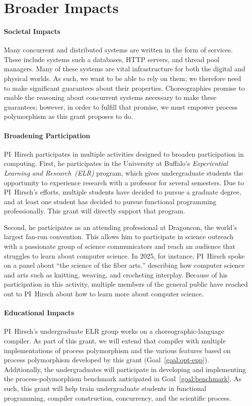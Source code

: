 \section{Broader Impacts}
\label{sec:broader}

\paragraph{Societal Impacts}
Many concurrent and distributed systems are written in the form of services.
These include systems such a databases, HTTP servers, and thread pool managers.
Many of these systems are vital infrastructure for both the digital and physical worlds.
As such, we want to be able to rely on them; we therefore need to make significant guarantees about their properties.
Choreographies promise to enable the reasoning about concurrent systems necessary to make these guarantees; however, in order to fulfill that promise, we must empower process polymorphism as this grant proposes to do.

\paragraph{Broadening Participation}
PI~Hirsch participates in multiple activities designed to broaden participation in computing.
First, he participates in the University at Buffalo's \emph{Experiential Learning and Research~(ELR)} program, which gives undergraduate students the opportunity to experience research with a professor for several semesters.
Due to PI~Hirsch's efforts, multiple students have decided to pursue a graduate degree, and at least one student has decided to pursue functional programming professionally.
This grant will directly support that program.

Second, he participates as an attending professional at Dragoncon, the world's largest fan-run convention.
This allows him to participate in science outreach with a passionate group of science communicators and reach an audience that struggles to learn about computer science.
In 2025, for instance, PI~Hirsch spoke on a panel about ``the science of the fiber arts,'' describing how computer science and arts such as knitting, weaving, and crocheting interplay.
Because of his participation in this activity, multiple members of the general public have reached out to PI~Hirsch about how to learn more about computer science.

\paragraph{Educational Impacts}
PI~Hirsch's undergraduate ELR group works on a choreographic-language compiler.
As part of this grant, we will extend that compiler with multiple implementations of process polymorphism and the various features based on process polymorphism developed by this grant (Goal~\ref{goal:opt-epp}).
Additionally, the undergraduates will participate in developing and implementing the process-polymorphism benchmark anticipated in Goal~\ref{goal:benchmark}.
As such, this grant will help train undergraduate students in functional programming, compiler construction, concurrency, and the scientific process.

